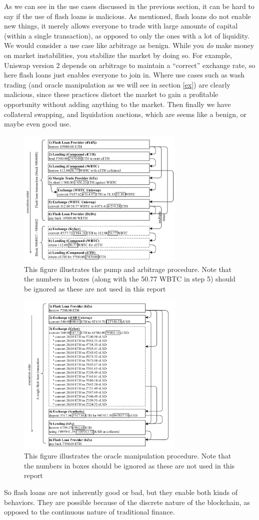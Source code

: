 As we can see in the use cases discussed in the previous section, it can be hard
to say if the use of flash loans is malicious. As mentioned, flash loans do not
enable new things, it merely allows everyone to trade with large amounts of
capital (within a single transaction), as opposed to only the ones with a lot of
liquidity. We would consider a use case like arbitrage as benign. While you
\textit{do} make money on market instabilities, you stabilize the market by
doing so. For example, Uniswap version 2 depends on arbitrage to maintain a
``correct'' exchange rate, so here flash loans just enables everyone to join in.
Where use cases such as wash trading (and oracle manipulation as we will see in
section \ref{ex}) are clearly malicious, since these practices distort the
market to gain a profitable opportunity without adding anything to the market.
Then finally we have collateral swapping, and liquidation auctions, which are
seems like a benign, or maybe even good use.\\
\begin{figure}
  \centering
  \includegraphics[width=8cm]{assests/pump-and-arb}
  \caption{This figure illustrates the pump and arbitrage
    procedure. Note that the numbers in boxes (along with the 50.77
    WBTC in step 5) should be ignored as these are not used in this
    report \cite[p. 5 fig. 6]{attack}}
  \label{fig:pumpAndArb}
\end{figure}
\begin{figure}
  \centering
  \includegraphics[width=8cm]{assests/oracle}
  \caption{This figure illustrates the oracle manipulation
    procedure. Note that the numbers in boxes should be ignored as
    these are not used in this report \cite[p. 6 fig. 7]{attack}}
  \label{fig:oracle}
\end{figure}
So flash loans are not inherently good or bad, but they enable both kinds of
behaviors. They are possible because of the discrete nature of the blockchain,
as opposed to the continuous nature of traditional finance.
